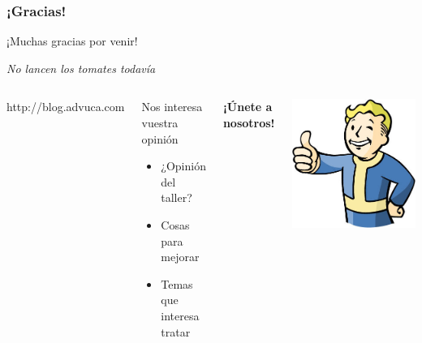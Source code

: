 \begin{frame}
	\frametitle{¡Gracias!}
	
	\begin{center}
    \huge{¡Muchas gracias por venir!}
    \end{center}
		
    \begin{center}
        \emph{No lancen los tomates todavía}
    \end{center}
    
	\begin{columns}[c]
	\column{200pt}	
	
	http://blog.advuca.com
	
	\begin{block}{Nos interesa vuestra opinión}
        \begin{itemize}
            \item ¿Opinión del taller?
            \item Cosas para mejorar
            \item Temas que interesa tratar
        \end{itemize}
	\end{block}
	
	\begin{center}
	    \textbf{¡Únete a nosotros!}
	\end{center}
	
	\column{100pt}
	\begin{center}
	    \includegraphics[scale=0.3]{img/thumbs-up.jpg}
	\end{center} 
    
    \end{columns}  
	
\end{frame}
